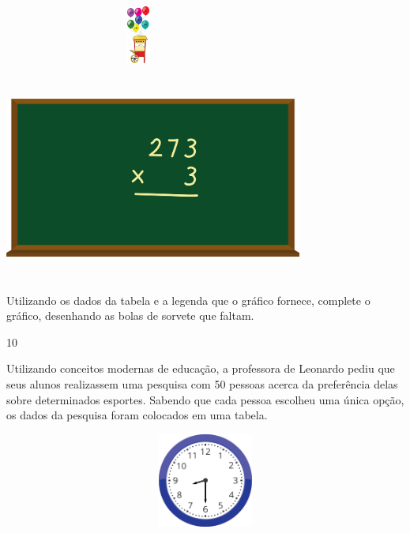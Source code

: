 \begin{multicols}{2}
\begin{enumerate}
{%

\includegraphics[width=3.47436in,height=0.75022in]{media/image98.png}

\includegraphics[width=3.86538in,height=2.63899in]{media/image99.png}

Utilizando os dados da tabela e a legenda que o gráfico fornece,
complete o gráfico, desenhando as bolas de sorvete que faltam.


\num{10}

Utilizando conceitos modernas de educação, a professora de Leonardo
pediu que seus alunos realizassem uma pesquisa com 50 pessoas acerca da
preferência delas sobre determinados esportes. Sabendo que cada pessoa
escolheu uma única opção, os dados da pesquisa foram colocados em uma tabela.


\includegraphics[width=5.39213in,height=1.22511in]{media/image100.png}

}
\end{enumerate}
\end{multicols}
